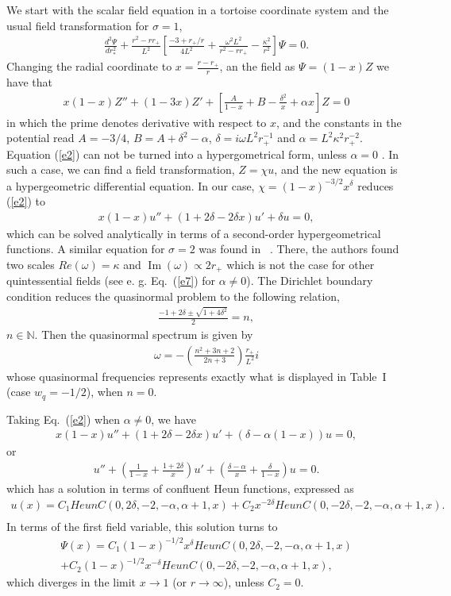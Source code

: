 \documentclass[preprint]{revtex4-1}
\renewcommand{\Im}{\operatorname{Im}}
\def\be{\begin{eqnarray}}
\def\ee{\end{eqnarray}}
\begin{document}
We start with the scalar field equation in a tortoise coordinate system and the usual field transformation for $\sigma=1$,
\be
\label{e1}
\frac{d^2 \Psi}{dr_*^2} + \frac{r^2-rr_+}{L^2}\left[ \frac{-3+r_+/r}{4L^2}+\frac{\omega^2 L^2}{r^2 - r r_+}-\frac{\kappa^2}{r^2}\right]\Psi=0.
\ee
Changing the radial coordinate to $x=\frac{r-r_+}{r}$, an the field as $\Psi = (1-x)Z$ we have that 
\be
\label{e2}
x(1-x)Z'' + (1-3x)Z' + \left[ \frac{A}{1-x} + B - \frac{\delta^2}{x} + \alpha x \right] Z=0
\ee
in which the prime denotes derivative with respect to $x$, and the constants in the potential read $A=-3/4$, $B = A+\delta^2 - \alpha$, $\delta = i \omega L^2 r_+^{-1}$ and $\alpha = L^2 \kappa^2 r_+^{-2}$. Equation (\ref{e2}) can not be turned into a hypergometrical form, unless $\alpha =0$ \cite{nikiforov}. In such a case, we can find a field transformation, $Z= \chi u$, and the new equation is a hypergeometric differential equation. In our case, $\chi = (1-x)^{-3/2} x^{\delta}$ reduces (\ref{e2}) to 
\be
\label{e3}
x(1-x)u''+ (1+2\delta-2\delta x)u'+ \delta u=0,
\ee
which can be solved analytically in terms of a second-order hypergeometrical functions. A similar equation for $\sigma =2$ was found in ~\cite{Cardoso:2001hn}. There, the authors found two scales $Re(\omega) = \kappa$ and $\Im (\omega) \propto 2r_+$ which is not the case for other quintessential fields (see e. g. Eq.~(\ref{e7}) for $\alpha \neq 0$). The Dirichlet boundary condition reduces the quasinormal problem to the following relation,
\be
\label{e4}
\frac{-1+2\delta \pm \sqrt{1+4\delta^2}}{2} = n,
\ee
$n \in \mathbb{N}$. Then the quasinormal spectrum is given by
\be
\label{e5}
\omega = -\left( \frac{n^2+3n+2}{2n+3}\right) \frac{r_+}{L^2}i
\ee
whose quasinormal frequencies represents exactly what is displayed in Table~I (case $w_q=-1/2$), when $n=0$. 

Taking Eq.~(\ref{e2}) when $\alpha \neq 0$, we have
\be
\label{e6}
x(1-x)u''+ (1+2\delta-2\delta x)u'+ (\delta -\alpha (1-x))u=0,
\ee
or
\be
\label{e7}
u'' + \left(\frac{1}{1-x} + \frac{1+2\delta}{x}\right) u' + \left( \frac{\delta -\alpha}{x} + \frac{\delta }{1-x} \right) u=0.
\ee
which has a solution in terms of confluent Heun functions, expressed as
\be\nonumber
\label{e8}
u(x) = C_1 HeunC(0,2\delta , - 2, - \alpha , \alpha + 1, x) + C_2 x^{-2\delta}HeunC(0,-2\delta , - 2, - \alpha , \alpha + 1, x).\\
\ee
In terms of the first field variable, this solution turns to
\begin{eqnarray}\nonumber
\label{e9}
\Psi (x) = C_1 (1-x)^{-1/2}x^{\delta}HeunC(0,2\delta , - 2, - \alpha , \alpha + 1, x) \\
+ C_2 (1-x)^{-1/2}x^{-\delta}HeunC(0,-2\delta , - 2, - \alpha , \alpha + 1, x),
\end{eqnarray}
which diverges in the limit $x \rightarrow 1$ (or $r \rightarrow \infty$), unless $C_2 = 0$. 
\end{document}
